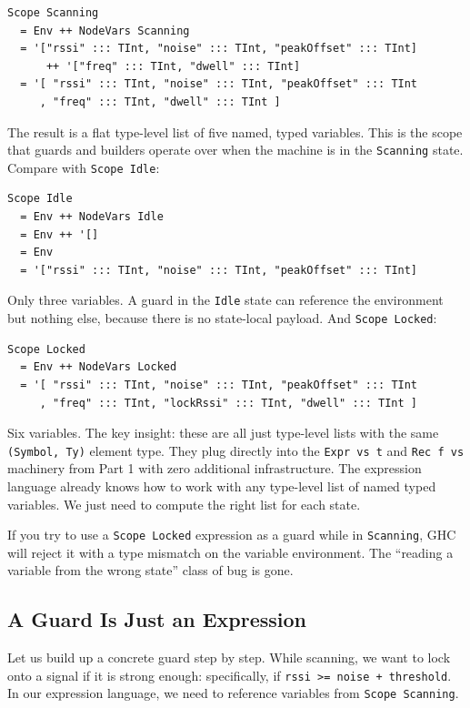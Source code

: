 \documentclass[]{article}
\begin{document}
\begin{verbatim}
Scope Scanning
  = Env ++ NodeVars Scanning
  = '["rssi" ::: TInt, "noise" ::: TInt, "peakOffset" ::: TInt]
      ++ '["freq" ::: TInt, "dwell" ::: TInt]
  = '[ "rssi" ::: TInt, "noise" ::: TInt, "peakOffset" ::: TInt
     , "freq" ::: TInt, "dwell" ::: TInt ]
\end{verbatim}

The result is a flat type-level list of five named, typed variables. This is the
scope that guards and builders operate over when the machine is in the
\texttt{Scanning} state. Compare with \texttt{Scope\ Idle}:

\begin{verbatim}
Scope Idle
  = Env ++ NodeVars Idle
  = Env ++ '[]
  = Env
  = '["rssi" ::: TInt, "noise" ::: TInt, "peakOffset" ::: TInt]
\end{verbatim}

Only three variables. A guard in the \texttt{Idle} state can reference the
environment but nothing else, because there is no state-local payload. And
\texttt{Scope\ Locked}:

\begin{verbatim}
Scope Locked
  = Env ++ NodeVars Locked
  = '[ "rssi" ::: TInt, "noise" ::: TInt, "peakOffset" ::: TInt
     , "freq" ::: TInt, "lockRssi" ::: TInt, "dwell" ::: TInt ]
\end{verbatim}

Six variables. The key insight: these are all just type-level lists with the
same \texttt{(Symbol,\ Ty)} element type. They plug directly into the
\texttt{Expr\ vs\ t} and \texttt{Rec\ f\ vs} machinery from Part 1 with zero
additional infrastructure. The expression language already knows how to work
with any type-level list of named typed variables. We just need to compute the
right list for each state.

If you try to use a \texttt{Scope\ Locked} expression as a guard while in
\texttt{Scanning}, GHC will reject it with a type mismatch on the variable
environment. The ``reading a variable from the wrong state'' class of bug is
gone.

\subsection{A Guard Is Just an Expression}\label{a-guard-is-just-an-expression}

Let us build up a concrete guard step by step. While scanning, we want to lock
onto a signal if it is strong enough: specifically, if
\texttt{rssi\ \textgreater{}=\ noise\ +\ threshold}. In our expression language,
we need to reference variables from \texttt{Scope\ Scanning}.
\end{document}
